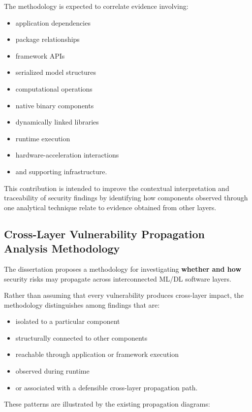 \documentclass[
  12pt,
  letterpaper,
  oneside]{report}
\providecommand{\tightlist}{%
  \setlength{\itemsep}{0pt}\setlength{\parskip}{0pt}}
\begin{document}
The methodology is expected to correlate evidence involving:

\begin{itemize}
\tightlist
\item
  application dependencies
\item
  package relationships
\item
  framework APIs
\item
  serialized model structures
\item
  computational operations
\item
  native binary components
\item
  dynamically linked libraries
\item
  runtime execution
\item
  hardware-acceleration interactions
\item
  and supporting infrastructure.
\end{itemize}

This contribution is intended to improve the contextual interpretation
and traceability of security findings by identifying how components
observed through one analytical technique relate to evidence obtained
from other layers.

\subsection{Cross-Layer Vulnerability Propagation Analysis Methodology}\label{1223-cross-layer-vulnerability-propagation-analysis-methodology}

The dissertation proposes a methodology for investigating
\textbf{whether and how} security risks may propagate across
interconnected ML/DL software layers.

Rather than assuming that every vulnerability produces cross-layer
impact, the methodology distinguishes among findings that are:

\begin{itemize}
\tightlist
\item
  isolated to a particular component
\item
  structurally connected to other components
\item
  reachable through application or framework execution
\item
  observed during runtime
\item
  or associated with a defensible cross-layer propagation path.
\end{itemize}

These patterns are illustrated by the existing propagation diagrams:
\end{document}
